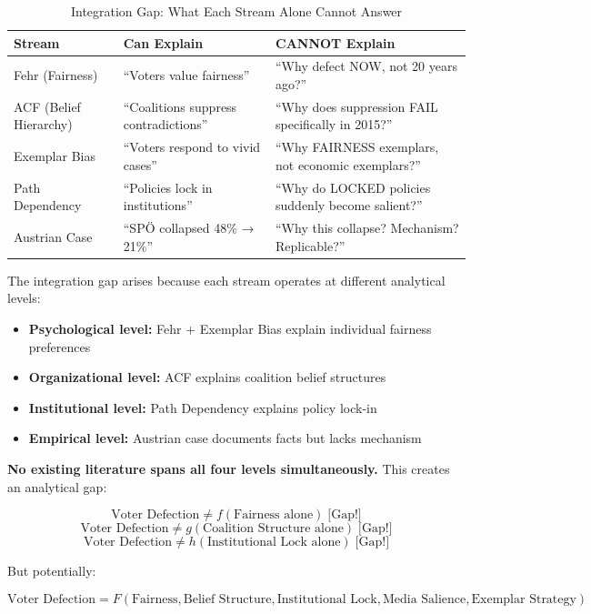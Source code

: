 \begin{table}[htbp]
\centering
\caption{Integration Gap: What Each Stream Alone Cannot Answer}
\label{tab:cm-integration-gap}
\renewcommand{\arraystretch}{1.3}
\begin{tabular}{@{}lll@{}}
\toprule
\textbf{Stream} & \textbf{Can Explain} & \textbf{CANNOT Explain} \\
\midrule
Fehr (Fairness) & ``Voters value fairness'' & ``Why defect NOW, not 20 years ago?'' \\
ACF (Belief Hierarchy) & ``Coalitions suppress contradictions'' & ``Why does suppression FAIL specifically in 2015?'' \\
Exemplar Bias & ``Voters respond to vivid cases'' & ``Why FAIRNESS exemplars, not economic exemplars?'' \\
Path Dependency & ``Policies lock in institutions'' & ``Why do LOCKED policies suddenly become salient?'' \\
Austrian Case & ``SPÖ collapsed 48\% → 21\%'' & ``Why this collapse? Mechanism? Replicable?'' \\
\bottomrule
\end{tabular}
\end{table}

The integration gap arises because each stream operates at different analytical levels:

\begin{itemize}[nosep]
\item \textbf{Psychological level:} Fehr + Exemplar Bias explain individual fairness preferences
\item \textbf{Organizational level:} ACF explains coalition belief structures
\item \textbf{Institutional level:} Path Dependency explains policy lock-in
\item \textbf{Empirical level:} Austrian case documents facts but lacks mechanism
\end{itemize}

\textbf{No existing literature spans all four levels simultaneously.} This creates an analytical gap:

$$\text{Voter Defection} \neq f(\text{Fairness alone}) \; \text{[Gap!]}$$
$$\text{Voter Defection} \neq g(\text{Coalition Structure alone}) \; \text{[Gap!]}$$
$$\text{Voter Defection} \neq h(\text{Institutional Lock alone}) \; \text{[Gap!]}$$

But potentially:

$$\text{Voter Defection} = F(\text{Fairness}, \text{Belief Structure}, \text{Institutional Lock}, \text{Media Salience}, \text{Exemplar Strategy})$$

